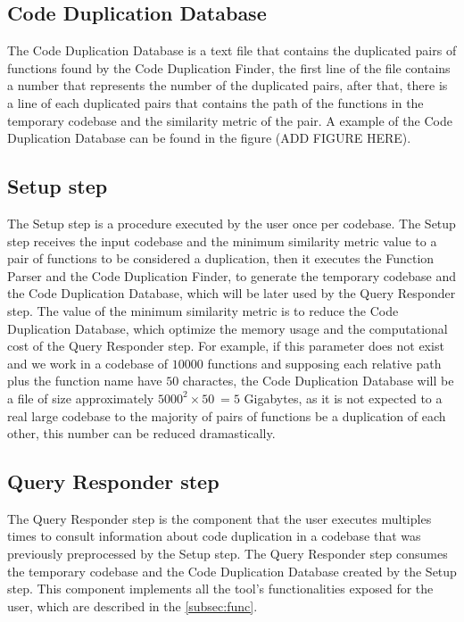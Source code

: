 \subsection{Code Duplication Database}

The Code Duplication Database is a text file that contains the duplicated pairs of functions found by the Code Duplication Finder, 
the first line of the file contains a number that represents the number of the duplicated pairs, after that, there is 
a line of each duplicated pairs that contains the path of the functions in the temporary codebase and the similarity metric of the 
pair. A example of the Code Duplication Database can be found in the figure (ADD FIGURE HERE). 

\subsection{Setup step}

\label{subsec:setup}

The Setup step is a procedure executed by the user once per codebase. The Setup step receives the input codebase and the minimum
similarity metric value to a pair of functions to be considered a duplication, then it executes the Function Parser and the Code 
Duplication Finder, to generate the temporary codebase and the Code Duplication Database, which will be later used by the Query
Responder step. The value of the minimum similarity metric is to reduce the Code Duplication Database, which optimize the
memory usage and the computational cost of the Query Responder step. For example, if this parameter does not exist and we work in 
a codebase of $10000$ functions and supposing each relative path plus the function name have $50$ charactes, the Code Duplication 
Database will be a file of size approximately $5000^2 \times 50 ~= 5$ Gigabytes, as it is not expected to a real large codebase 
to the majority of pairs of functions be a duplication of each other, this number can be reduced dramastically.

\subsection{Query Responder step}

The Query Responder step is the component that the user executes multiples times to consult information about code duplication in
a codebase that was previously preprocessed by the Setup step. The Query Responder step consumes the temporary codebase and the 
Code Duplication Database created by the Setup step. This component implements all the tool's functionalities exposed 
for the user, which are described in the \ref{subsec:func}.

